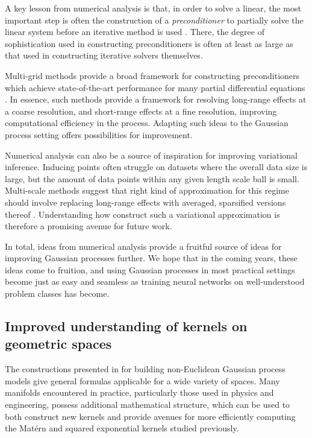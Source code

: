 \documentclass[11pt]{book}
\begin{document}
A key lesson from numerical analysis is that, in order to solve a linear, the most important step is often the construction of a \emph{preconditioner} to partially solve the linear system before an iterative method is used \cite{saad03,e11,xu17}.
There, the degree of sophistication used in constructing preconditioners is often at least as large as that used in constructing iterative solvers themselves.

Multi-grid methods provide a broad framework for constructing preconditioners which achieve state-of-the-art performance for many partial differential equations \cite{e11,xu17}. 
In essence, such methods provide a framework for resolving long-range effects at a coarse resolution, and short-range effects at a fine resolution, improving computational efficiency in the process.
Adapting such ideas to the Gaussian process setting offers possibilities for improvement.

Numerical analysis can also be a source of inspiration for improving variational inference.
Inducing points often struggle on datasets where the overall data size is large, but the amount of data points within any given length scale ball is small.
Multi-scale methods suggest that right kind of approximation for this regime should involve replacing long-range effects with averaged, sparsified versions thereof \cite{e11,xu17}.
Understanding how construct such a variational approximation is therefore a promising avenue for future work.

In total, ideas from numerical analysis provide a fruitful source of ideas for improving Gaussian processes further.
We hope that in the coming years, these ideas come to fruition, and using Gaussian processes in most practical settings become just as easy and seamless as training neural networks on well-understood problem classes has become.


\subsection*{Improved understanding of kernels on geometric spaces}

The constructions presented in  for building non-Euclidean Gaussian process models give general formulas applicable for a wide variety of spaces.
Many manifolds encountered in practice, particularly those used in physics and engineering, possess additional mathematical structure, which can be used to both construct new kernels and provide avenues for more efficiently computing the Matérn and squared exponential kernels studied previously.
\end{document}
